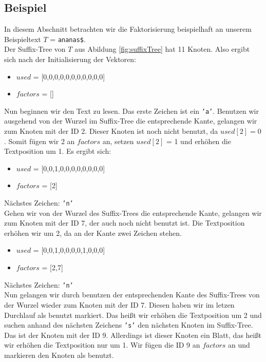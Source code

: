 \documentclass[a4paper,11pt]{scrartcl}%
\theoremstyle{change}
\theoremstyle{nonumberplain}
\theoremstyle{change}
\theoremstyle{nonumberplain}
\theoremstyle{change}
\theoremstyle{nonumberplain}
\begin{document}
\subsection{Beispiel}

In diesem Abschnitt betrachten wir die Faktorisierung beispielhaft an unserem Beispieltext $T$ = \texttt{ananas\$}.\\
Der Suffix-Tree von $T$ aus Abildung \ref{fig:suffixTree} hat 11 Knoten. Also ergibt sich nach der Initialisierung der Vektoren:
\begin{itemize}
	\item $used$ = [0,0,0,0,0,0,0,0,0,0,0]
	\item $factors$ = []
\end{itemize}

Nun beginnen wir den Text zu lesen. Das erste Zeichen ist ein \texttt{'a'}. Benutzen wir ausgehend von der Wurzel im Suffix-Tree die entsprechende Kante, gelangen wir zum Knoten mit der ID 2. Dieser Knoten ist noch nicht benutzt, da $used[2] = 0$. Somit fügen wir 2 an $factors$ an, setzen $used[2]$ = 1 und erhöhen die Textposition um 1. Es ergibt sich:
\begin{itemize}
	\item $used$ = [0,0,1,0,0,0,0,0,0,0,0]
	\item $factors$ = [2]
\end{itemize}

Nächstes Zeichen: \texttt{'n'}\\
Gehen wir von der Wurzel des Suffix-Trees die entsprechende Kante, gelangen wir zum Knoten mit der ID 7, der auch noch nicht benutzt ist. Die Textposition erhöhen wir um 2, da an der Kante zwei Zeichen stehen.

\begin{itemize}
	\item $used$ = [0,0,1,0,0,0,0,1,0,0,0]
	\item $factors$ = [2,7]
\end{itemize}

Nächstes Zeichen: \texttt{'n'}\\
Nun gelangen wir durch benutzen der entsprechenden Kante des Suffix-Trees von der Wurzel  wieder zum Knoten mit der ID 7. Diesen haben wir im letzen Durchlauf als benutzt markiert. Das heißt wir erhöhen die Textposition um 2 und suchen anhand des nächsten Zeichens \texttt{'s'} den nächsten Knoten im Suffix-Tree. Das ist der Knoten mit der ID 9. Allerdings ist dieser Knoten ein Blatt, das heißt wir erhöhen die Textposition nur um 1. Wir fügen die ID 9 an $factors$ an und markieren den Knoten als benutzt.
\end{document}
